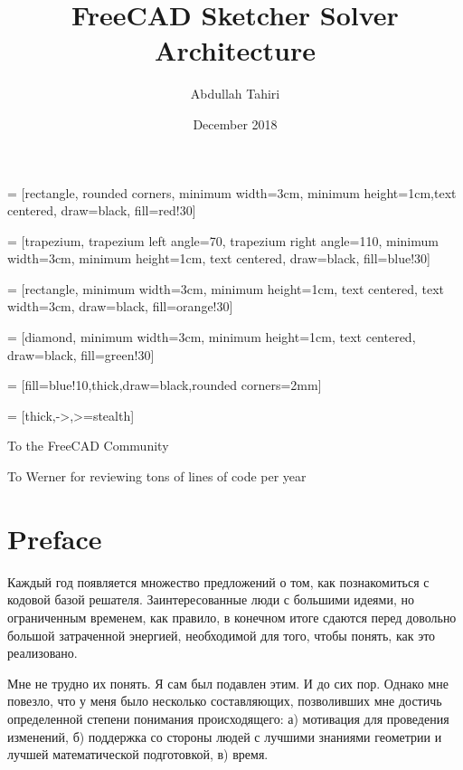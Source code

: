 \documentclass[12pt,twoside,a4paper]{book}
\title{FreeCAD Sketcher Solver Architecture}
\author{Abdullah Tahiri}
\date{December 2018}
\newenvironment{dedication}
  {\clearpage           %
   \thispagestyle{empty}%
   \vspace*{\stretch{1}}%
   \itshape             %
   \raggedleft          %
  }
  {\par %
   \vspace{\stretch{3}} %
   \clearpage           %
  }
\begin{document}
     = [rectangle, rounded corners, minimum width=3cm, minimum height=1cm,text centered, draw=black, fill=red!30]

     = [trapezium, trapezium left angle=70, trapezium right angle=110, minimum width=3cm, minimum height=1cm, text centered, draw=black, fill=blue!30]


     = [rectangle, minimum width=3cm, minimum height=1cm, text centered, text width=3cm, draw=black, fill=orange!30]

     = [diamond, minimum width=3cm, minimum height=1cm, text centered, draw=black, fill=green!30]

     = [fill=blue!10,thick,draw=black,rounded corners=2mm]

     = [thick,->,>=stealth]

    \frontmatter

    \maketitle

    \begin{dedication}
        To the FreeCAD Community
        \par   %
        \vspace{2\baselineskip}
        To Werner for reviewing tons of lines of code per year
    \end{dedication}


    \chapter{Preface}

    Каждый год появляется множество предложений о том, как познакомиться с кодовой базой решателя. Заинтересованные люди с большими идеями, но ограниченным временем, как правило, в конечном итоге сдаются перед довольно большой затраченной энергией, необходимой для того, чтобы понять, как это реализовано.

    Мне не трудно их понять. Я сам был подавлен этим. И до сих пор. Однако мне повезло, что у меня было несколько составляющих, позволивших мне достичь определенной степени понимания происходящего: а) мотивация для проведения изменений, б) поддержка со стороны людей с лучшими знаниями геометрии и лучшей математической подготовкой, в) время.
\end{document}
